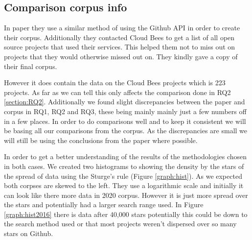 \documentclass[10pt,conference]{IEEEtran}
\begin{document}
\vspace*{-0.05in}
\subsection{Comparison corpus info}
\label{section:HiltonComaprisonCoprusTHing}
\vspace*{-0.05in}
In \citet{Hilton2016} paper they use a similar method of using the Github API in order to create their corpus. Additionally they contacted Cloud Bees \citet{CloudBees2020} to get a list of all open source projects that used their services. This helped them not to miss out on projects that they would otherwise missed out on. They kindly gave a copy of their final corpus. 

However it does contain the data on the Cloud Bees projects which is 223 projects. As far as we can tell this only affects the comparison done in RQ2 \ref{section:RQ2}. Additionally we found slight discrepancies between the paper and corpus in RQ1, RQ2 and RQ3, these being mainly mainly just a few numbers off in a few places. In order to do comparisons well and to keep it consistent we will be basing all our comparisons from the corpus. As the discrepancies are small we will still be using the conclusions from the paper where possible.  

In order to get a better understanding of the results of the methodologies chosen in both cases. We created two histograms to showing the density by the stars of the spread of data using the Sturge's rule (Figure \ref{graph:hist}). As we expected both corpses are skewed to the left. They use a logarithmic scale and initially it can look like there more data in 2020 corpus. However it is just more spread over the stars and potentially had a larger search range used. In Figure \ref{graph:hist2016} there is data after 40,000 stars potentially this could be down to the search method used or that most projects weren't dispersed over so many stars on Github.   
\end{document}
